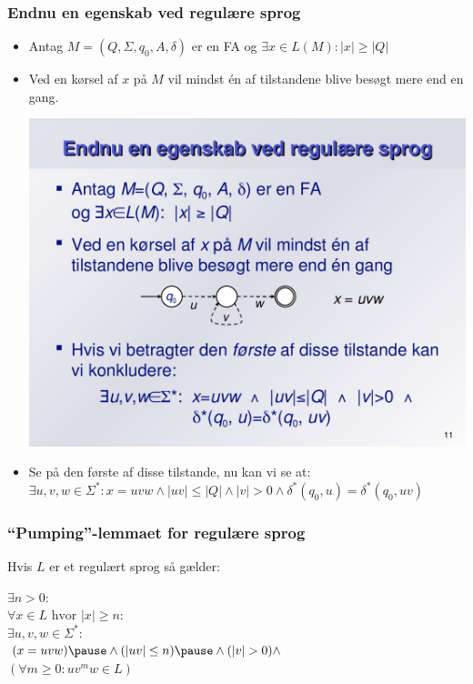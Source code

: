 \begin{frame}
\frametitle{Endnu en egenskab ved regulære sprog}
\begin{itemize}[<+->]
\item Antag $M=(Q, \Sigma, q_0, A, \delta)$ er en FA og $\exists x\in L(M): |x| \geq |Q|$
\item Ved en kørsel af $x$ på $M$ vil mindst én af tilstandene blive
  besøgt mere end en gang.
    \begin{center}
    \includegraphics[scale=.40]{images/pumping}
    \end{center}
\item Se på \alert{den første} af disse tilstande, nu kan vi se at:
  $\exists u,v,w\in \Sigma^*: x=uvw \wedge |uv| \leq |Q| \wedge |v|>0 \wedge
  \delta^*(q_0,u)=\delta^*(q_0,uv)$
\end{itemize}
\end{frame}

\begin{frame}
\frametitle{``Pumping''-lemmaet for regulære sprog}
Hvis $L$ er et regulært sprog så gælder:

\hspace{1cm}$\exists n>0:$\\
\pause
\hspace{2cm}$\forall x\in L \text{ hvor } |x| \geq n:$\\
\pause
\hspace{3cm}$\exists u,v,w\in \Sigma^*:$\\
\pause
\hspace{4cm}$(x = uvw) \pause \wedge (|uv|\leq n) \pause \wedge (|v| > 0) \wedge$\\
\pause
\hspace{4cm}$(\forall m\geq 0: uv^mw\in L)$\\
\pause
\end{frame}

